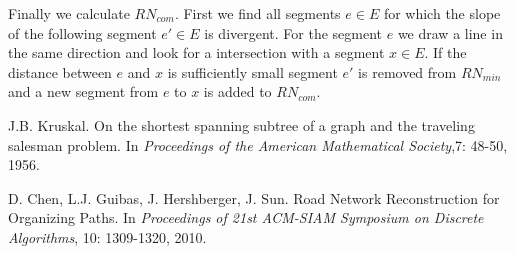 \documentclass[11pt, twocolumn]{article}
\begin{document}
 Finally we calculate $RN_{com}$. First we find all segments $e \in E$ for which the slope of the following segment $e' \in E$ is divergent. For the segment $e$ we draw a line in the same direction and look for a intersection with a segment $x \in E$. If the distance between $e$ and $x$ is sufficiently small segment $e'$ is removed from $RN_{min}$ and a new segment from $e$ to $x$ is added to $RN_{com}$.




\begin{thebibliography}{}

J.B. Kruskal.
On the shortest spanning subtree of a graph and the traveling salesman problem.
In \emph{Proceedings of the American Mathematical Society},7: 48-50, 1956.

D. Chen, L.J. Guibas, J. Hershberger, J. Sun.
Road Network Reconstruction for Organizing Paths.
In \emph{Proceedings  of  21st  ACM-SIAM  Symposium  on  Discrete  Algorithms}, 10: 1309-1320, 2010.
\end{thebibliography}
\end{document}
